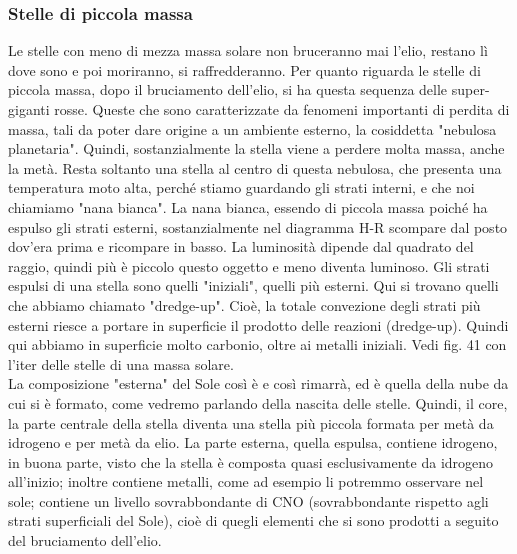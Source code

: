 \documentclass[a4paper,11pt]{article}
\begin{document}
\subsubsection{Stelle di piccola massa}
Le stelle con meno di mezza massa solare non bruceranno mai l'elio, restano lì dove sono e poi moriranno, si raffredderanno. Per quanto riguarda le stelle di piccola massa, dopo il bruciamento dell'elio, si ha questa sequenza delle super-giganti rosse. Queste che sono caratterizzate da fenomeni importanti di perdita di massa, tali da poter dare origine a un ambiente esterno, la cosiddetta "nebulosa planetaria". Quindi, sostanzialmente la stella viene a perdere molta massa, anche la metà. Resta soltanto una stella al centro di questa nebulosa, che presenta una temperatura moto alta, perché stiamo guardando gli strati interni, e che noi chiamiamo "nana bianca". La nana bianca, essendo di piccola massa poiché ha espulso gli strati esterni, sostanzialmente nel diagramma H-R scompare dal posto dov'era prima e ricompare in basso. La luminosità dipende dal quadrato del raggio, quindi più è piccolo questo oggetto e meno diventa luminoso. Gli strati espulsi di una stella sono quelli "iniziali", quelli più esterni. Qui si trovano quelli che abbiamo chiamato "dredge-up". Cioè, la totale convezione degli strati più esterni riesce a portare in superficie il prodotto delle reazioni (dredge-up). Quindi qui abbiamo in superficie molto carbonio, oltre ai metalli iniziali. Vedi fig. 41 con l'iter delle stelle di una massa solare. \\ La composizione "esterna" del Sole così è e così rimarrà, ed è quella della nube da cui si è formato, come vedremo parlando della nascita delle stelle. Quindi, il core, la parte centrale della stella diventa una stella più piccola formata per metà da idrogeno e per metà da elio. La parte esterna, quella espulsa, contiene idrogeno, in buona parte, visto che la stella è composta quasi esclusivamente da idrogeno all'inizio; inoltre contiene metalli, come ad esempio li potremmo osservare nel sole; contiene un livello sovrabbondante di CNO (sovrabbondante rispetto agli strati superficiali del Sole), cioè di quegli elementi che si sono prodotti a seguito del bruciamento dell'elio. \\ 
\end{document}
